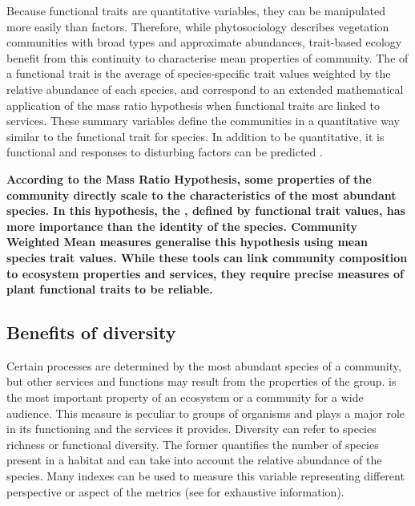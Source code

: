 Because functional traits are quantitative variables, they can be manipulated more easily than factors. Therefore, while phytosociology describes vegetation communities with broad types and approximate abundances, trait-based ecology benefit from this continuity to characterise mean properties of community. The  of a functional trait is the average of species-specific trait values weighted by the relative abundance of each species, and correspond to an extended mathematical application of the mass ratio hypothesis when functional traits are linked to services. These summary variables define the communities in a quantitative way similar to the functional trait for species. In addition to be quantitative, it is functional and responses to disturbing factors can be predicted \parencite{lavorel_predicting_2002}.

\textbf{According to the Mass Ratio Hypothesis, some properties of the community directly scale to the characteristics of the most abundant species. In this hypothesis, the , defined by functional trait values, has more importance than the identity of the species. Community Weighted Mean measures generalise this hypothesis using mean species trait values. While these tools can link community composition to ecosystem properties and services, they require precise measures of plant functional traits to be reliable.}

\subsection{Benefits of diversity}

Certain processes are determined by the most abundant species of a community, but other services and functions may result from the properties of the group.  is the most important property of an ecosystem or a community for a wide audience. This measure is peculiar to groups of organisms and plays a major role in its functioning and the services it provides. Diversity can refer to species richness or functional diversity. The former quantifies the number of species present in a habitat and can take into account the relative abundance of the species. Many indexes can be used to measure this variable representing different perspective or aspect of the metrics (see \cite{chalmandrier_communities_2015} for exhaustive information).

